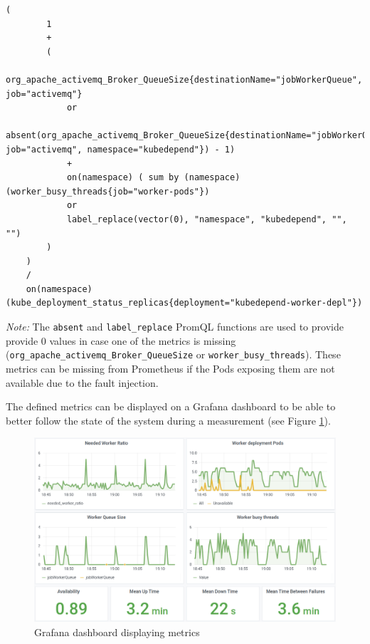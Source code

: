 \vspace{0.5cm}
\begin{minipage}{\linewidth}
	\begin{lstlisting}[caption={\texttt{needed\_worker\_ratio} defined in PromQL}, label={lst:promql-availability}]
	(
		1
		+
		(
			org_apache_activemq_Broker_QueueSize{destinationName="jobWorkerQueue", job="activemq"}
			or
			absent(org_apache_activemq_Broker_QueueSize{destinationName="jobWorkerQueue", job="activemq", namespace="kubedepend"}) - 1)
			+
			on(namespace) ( sum by (namespace) (worker_busy_threads{job="worker-pods"})
			or
			label_replace(vector(0), "namespace", "kubedepend", "", "")
		)
	)
	/
	on(namespace) (kube_deployment_status_replicas{deployment="kubedepend-worker-depl"})\end{lstlisting}
\end{minipage}

\emph{Note:} The \texttt{absent} and \texttt{label\_replace} PromQL functions are used to provide provide 0 values in case one of the metrics is missing (\texttt{org\_apache\_activemq\_Broker\_QueueSize} or \texttt{worker\_busy\_threads}). These metrics can be missing from Prometheus if the Pods exposing them are not available due to the fault injection.

The defined metrics can be displayed on a Grafana dashboard to be able to better follow the state of the system during a measurement (see Figure \ref{fig:grafana-dashboard}). 

\begin{figure}[h]
	\centering
	\includegraphics[width=150mm, keepaspectratio]{figures/grafana-dep.png}
	\caption{Grafana dashboard displaying metrics}
	\label{fig:grafana-dashboard}
\end{figure}


